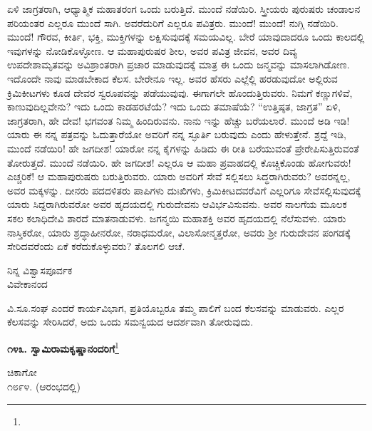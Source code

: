 ಏಳಿ ಜಾಗ್ರತರಾಗಿ, ಆಧ್ಯಾತ್ಮಿಕ ಮಹಾತರಂಗ ಒಂದು ಬರುತ್ತಿದೆ. ಮುಂದೆ ನಡೆಯಿರಿ. ಸ್ತ್ರೀಯರು ಪುರುಷರು ಚಂಡಾಲನ ಪರಿಯಂತರ ಎಲ್ಲರೂ ಮುಂದೆ ಸಾಗಿ. ಅವರೆದುರಿಗೆ ಎಲ್ಲರೂ ಪವಿತ್ರರು. ಮುಂದೆ! ಮುಂದೆ! ನುಗ್ಗಿ ನಡೆಯಿರಿ. ಮುಂದೆ! ಗೌರವ, ಕೀರ್ತಿ, ಭಕ್ತಿ, ಮುಕ್ತಿಗಳನ್ನು ಲಕ್ಷಿಸುವುದಕ್ಕೆ ಸಮಯವಿಲ್ಲ. ಬೇರೆ ಯಾವುದಾದರೂ ಒಂದು ಕಾಲದಲ್ಲಿ ಇವುಗಳನ್ನು ನೋಡಿಕೊಳ್ಳೋಣ. ಆ ಮಹಾಪುರುಷರ ಶೀಲ, ಅವರ ಪವಿತ್ರ ಜೀವನ, ಅವರ ದಿವ್ಯ ಉಪದೇಶಾಮೃತವನ್ನು ಅವಿಶ್ರಾಂತರಾಗಿ ಪ್ರಚಾರ ಮಾಡುವುದಕ್ಕೆ ಮಾತ್ರ ಈ ಒಂದು ಜನ್ಮವನ್ನು ಮಾಸಲಾಗಿಡೋಣ. ಇದೊಂದೇ ನಾವು ಮಾಡಬೇಕಾದ ಕೆಲಸ. ಬೇರೇನೂ ಇಲ್ಲ. ಅವರ ಹೆಸರು ಎಲ್ಲೆಲ್ಲಿ ಹರಡುವುದೋ ಅಲ್ಲಿರುವ ಕ್ರಿಮಿಕೀಟಗಳು ಕೂಡ ದೇವರ ಸ್ವರೂಪವನ್ನು ಪಡೆಯುವುವು. ಈಗಾಗಲೇ ಹೊಂದುತ್ತಿರುವರು. ನಿಮಗೆ ಕಣ್ಣುಗಳಿವೆ, ಕಾಣುವುದಿಲ್ಲವೇನು? ಇದು ಒಂದು ಕಾಡಹರಟೆಯೆ? ಇದು ಒಂದು ತಮಾಷೆಯೆ? ``ಉತ್ತಿಷ್ಠತ, ಜಾಗ್ರತ'' ಏಳಿ, ಜಾಗ್ರತರಾಗಿ, ಹೇ ದೇವ! ಭಗವಂತ ನಿಮ್ಮ ಹಿಂದಿರುವನು. ನಾನು ಇನ್ನು ಹೆಚ್ಚು ಬರೆಯಲಾರೆ. ಮುಂದೆ ಅಡಿ ಇಡಿ! ಯಾರು ಈ ನನ್ನ ಪತ್ರವನ್ನು ಓದುತ್ತಾರೆಯೋ ಅವರಿಗೆ ನನ್ನ ಸ್ಫೂರ್ತಿ ಬರುವುದು ಎಂದು ಹೇಳುತ್ತೇನೆ. ಶ್ರದ್ದೆ ಇಡಿ, ಮುಂದೆ ನಡೆಯಿರಿ! ಹೇ ಜಗದೀಶ! ಯಾರೋ ನನ್ನ ಕೈಗಳನ್ನು ಹಿಡಿದು ಈ ರೀತಿ ಬರೆಯುವಂತೆ ಪ್ರೇರೇಪಿಸುತ್ತಿರುವಂತೆ ತೋರುತ್ತದೆ. ಮುಂದೆ ನಡೆಯಿರಿ. ಹೇ ಜಗದೀಶ! ಎಲ್ಲರೂ ಆ ಮಹಾ ಪ್ರವಾಹದಲ್ಲಿ ಕೊಚ್ಚಿಕೊಂಡು ಹೋಗುವರು! ಎಚ್ಚರಿಕೆ! ಆ ಮಹಾಪುರುಷರು ಬರುತ್ತಿರುವರು. ಯಾರು ಅವರಿಗೆ ಸೇವೆ ಸಲ್ಲಿಸಲು ಸಿದ್ಧರಾಗಿರುವರು? ಅವರನ್ನಲ್ಲ, ಅವರ ಮಕ್ಕಳನ್ನು. ದೀನರು ಪದದಳಿತರು ಪಾಪಿಗಳು ದುಃಖಿಗಳು, ಕ್ರಿಮಿಕೀಟದವರೆವಿಗೆ ಎಲ್ಲರಿಗೂ ಸೇವೆಸಲ್ಲಿಸುವುದಕ್ಕೆ ಯಾರು ಸಿದ್ದರಾಗಿರುವರೋ ಅವರ ಹೃದಯದಲ್ಲಿ ಗುರುದೇವನು ಆವಿರ್ಭವಿಸುವನು. ಅವರ ನಾಲಗೆಯ ಮೂಲಕ ಸಕಲ ಕಲಾಧಿದೇವಿ ಶಾರದೆ ಮಾತನಾಡುವಳು. ಜಗನ್ಮಯಿ ಮಹಾಶಕ್ತಿ ಅವರ ಹೃದಯದಲ್ಲಿ ನೆಲೆಸುವಳು. ಯಾರು ನಾಸ್ತಿಕರೋ, ಯಾರು ಶ್ರದ್ಧಾಹೀನರೋ, ನರಾಧಮರೋ, ವಿಲಾಸೋನ್ಮತ್ತರೋ, ಅವರು ಶ‍್ರೀ ಗುರುದೇವನ ಪಂಗಡಕ್ಕೆ ಸೇರಿದವರೆಂದು ಏಕೆ ಕರೆದುಕೊಳ್ಳುವರು? ತೊಲಗಲಿ ಆಚೆ.

\vspace{-0.7cm}

\begin{flushright}
ನಿನ್ನ ವಿಶ್ವಾಸಪೂರ್ವಕ\\ವಿವೇಕಾನಂದ
\end{flushright}

\vspace{-0.3cm}

ವಿ.ಸೂ.\enginline{-}ಸಂಘ ಎಂದರೆ ಕಾರ್ಯವಿಭಾಗ, ಪ್ರತಿಯೊಬ್ಬರೂ ತಮ್ಮ ಪಾಲಿಗೆ ಬಂದ ಕೆಲಸವನ್ನು ಮಾಡುವರು. ಎಲ್ಲರ ಕೆಲಸವನ್ನು ಸೇರಿಸಿದರೆ, ಅದು ಒಂದು ಸಮನ್ವಯದ ಆದರ್ಶವಾಗಿ ತೋರುವುದು.

\begin{center}
\textbf{೧೪೩. ಸ್ವಾಮಿರಾಮಕೃಷ್ಣಾನಂದರಿಗೆ}\footnote{}
\end{center}

\vspace{-0.9cm}

\begin{flushright}
ಚಿಕಾಗೋ\\೧೮೯೪. (ಆರಂಭದಲ್ಲಿ)
\end{flushright}

